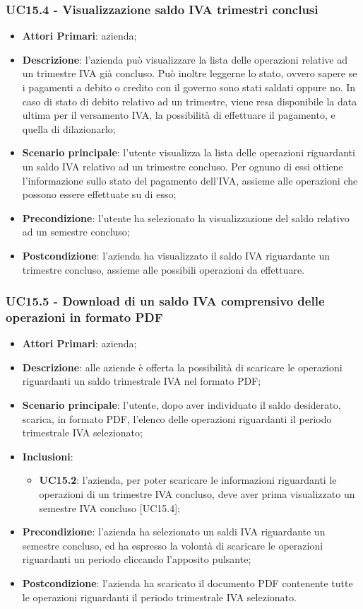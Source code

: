 \subsubsection{UC15.4 - Visualizzazione saldo IVA trimestri conclusi}
\begin{itemize}
	\item \textbf{Attori Primari}: azienda;
	\item \textbf{Descrizione}: l'azienda può visualizzare la lista delle operazioni relative ad un trimestre IVA già concluso. Può inoltre leggerne lo stato, ovvero sapere se i pagamenti a debito o credito con il governo sono stati saldati oppure no. In caso di stato di debito relativo ad un trimestre, viene resa disponibile la data ultima per il versamento IVA, la possibilità di effettuare il pagamento, e quella di dilazionarlo;
	\item \textbf{Scenario principale}: l'utente visualizza la lista delle operazioni riguardanti  un saldo IVA relativo ad un trimestre concluso. Per ognuno di essi ottiene l'informazione sullo stato del pagamento dell'IVA, assieme alle operazioni che possono essere effettuate su di esso;
	\item \textbf{Precondizione}: l'utente ha selezionato la visualizzazione del saldo relativo ad un semestre concluso;
	\item \textbf{Postcondizione}: l'azienda ha visualizzato il saldo IVA riguardante un trimestre concluso, assieme alle possibili operazioni da effettuare.
\end{itemize} 

\subsubsection{UC15.5 - Download di un saldo IVA comprensivo delle operazioni in formato PDF}
\begin{itemize}
	\item \textbf{Attori Primari}: azienda;
	\item \textbf{Descrizione}: alle aziende è offerta la possibilità di scaricare le operazioni riguardanti un saldo trimestrale IVA nel formato PDF;
	\item \textbf{Scenario principale}: l'utente, dopo aver individuato il saldo desiderato, scarica, in formato PDF, l'elenco delle operazioni riguardanti il periodo trimestrale IVA selezionato;
	\item \textbf{Inclusioni}:
	\begin{itemize}
		\item \textbf{UC15.2}: l'azienda, per poter scaricare le informazioni riguardanti le operazioni di un trimestre IVA concluso, deve aver prima visualizzato un semestre IVA concluso [UC15.4];
	\end{itemize}
	\item \textbf{Precondizione}: l'azienda ha selezionato un saldi IVA riguardante un semestre concluso, ed ha espresso la volontà di scaricare le operazioni riguardanti un periodo cliccando l'apposito pulsante;
	\item \textbf{Postcondizione}: l'azienda ha scaricato il documento PDF contenente tutte le operazioni riguardanti il periodo trimestrale IVA selezionato.
\end{itemize} 


